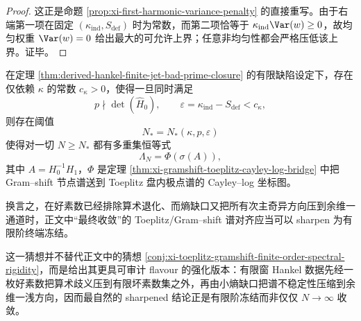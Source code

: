 \begin{proof}
这正是命题 \ref{prop:xi-first-harmonic-variance-penalty} 的直接重写。由于右端第一项在固定 \((\kappa_{\mathrm{ind}},S_{\mathrm{def}})\) 时为常数，而第二项恰等于 \(\kappa_{\mathrm{ind}}\Var(w)\ge 0\)，故均匀权重 \(\Var(w)=0\) 给出最大的可允许上界；任意非均匀性都会严格压低该上界。证毕。
\end{proof}

\begin{conjecture}[好素审计与小熵缺口应共同触发有限阶冻结]\label{conj:derived-hankel-badprime-smallgap-finite-freezing}
在定理 \ref{thm:derived-hankel-finite-jet-bad-prime-closure} 的有限缺陷设定下，存在仅依赖 \(\kappa\) 的常数 \(c_\kappa>0\)，使得一旦同时满足
\[
p\nmid \det(\widehat H_0),
\qquad
\varepsilon=\kappa_{\mathrm{ind}}-S_{\mathrm{def}}<c_\kappa,
\]
则存在阈值
\[
N_\ast=N_\ast(\kappa,p,\varepsilon)
\]
使得对一切 \(N\ge N_\ast\) 都有多重集恒等式
\[
\Lambda_N=\Phi(\sigma(A)),
\]
其中 \(A=H_0^{-1}H_1\)，\(\Phi\) 是定理 \ref{thm:xi-gramshift-toeplitz-cayley-log-bridge} 中把 Gram--shift 节点谱送到 Toeplitz 盘内极点谱的 Cayley--log 坐标图。

换言之，在好素数已经排除算术退化、而熵缺口又把所有次主奇异方向压到余维一通道时，正文中“最终收敛”的 Toeplitz/Gram--shift 谱对齐应当可以 sharpen 为有限阶终端冻结。
\end{conjecture}

\begin{remark}\label{rem:derived-hankel-smallgap-finite-freezing-support}
这一猜想并不替代正文中的猜想 \ref{conj:xi-toeplitz-gramshift-finite-order-spectral-rigidity}，而是给出其更具可审计 flavour 的强化版本：有限窗 Hankel 数据先经一枚好素数把算术歧义压到有限坏素数集之外，再由小熵缺口把谱不稳定性压缩到余维一浅方向，因而最自然的 sharpened 结论正是有限阶冻结而非仅仅 \(N\to\infty\) 收敛。
\end{remark}

